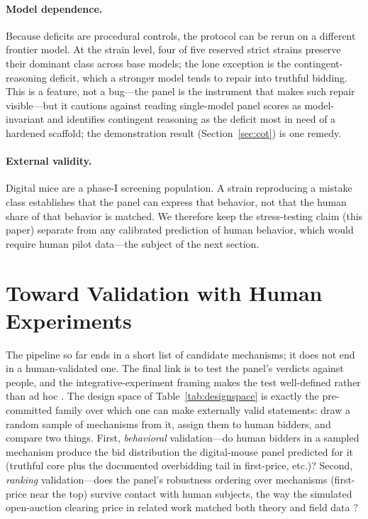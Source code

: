 \documentclass[12pt]{article}
\begin{document}
\paragraph{Model dependence.} Because deficits are procedural controls, the protocol
can be rerun on a different frontier model. At the strain level, four of five
reserved strict strains preserve their dominant class across base models; the lone
exception is the contingent-reasoning deficit, which a stronger model tends to
repair into truthful bidding. This is a feature, not a bug---the panel is the
instrument that makes such repair visible---but it cautions against reading
single-model panel scores as model-invariant and identifies contingent reasoning as
the deficit most in need of a hardened scaffold; the demonstration result
(Section~\ref{sec:cot}) is one remedy.

\paragraph{External validity.} Digital mice are a phase-I screening population. A
strain reproducing a mistake class establishes that the panel can express that
behavior, not that the human share of that behavior is matched. We therefore keep
the stress-testing claim (this paper) separate from any calibrated prediction of
human behavior, which would require human pilot data---the subject of the next
section.

\section{Toward Validation with Human Experiments}
\label{sec:validation}

The pipeline so far ends in a short list of candidate mechanisms; it does not end
in a human-validated one. The final link is to test the panel's verdicts against
people, and the integrative-experiment framing makes the test well-defined rather
than ad hoc \citep{almaatouq2024,alsobay2025integrative}. The design space of
Table~\ref{tab:designspace} is exactly the pre-committed family over which one can
make externally valid statements: draw a random sample of mechanisms from it,
assign them to human bidders, and compare two things. First, \emph{behavioral}
validation---do human bidders in a sampled mechanism produce the bid distribution
the digital-mouse panel predicted for it (truthful core plus the documented
overbidding tail in first-price, etc.)? Second, \emph{ranking} validation---does the
panel's robustness ordering over mechanisms (first-price near the top) survive
contact with human subjects, the way the simulated open-auction clearing price in
related work matched both theory and field data \citep{manning2024automated}?
\end{document}
